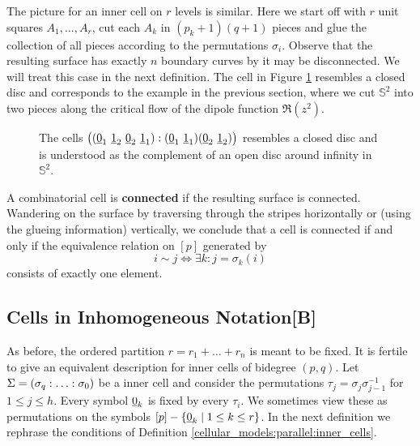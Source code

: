 The picture for an inner cell on $r$ levels is similar.
Here we start off with $r$ unit squares $A_1, \ldots, A_r$, cut each $A_k$ in $(p_k+1)(q+1)$ pieces and glue the collection of all pieces according to the permutations $\sigma_i$.
Observe that the resulting surface has exactly $n$ boundary curves by it may be disconnected.
We will treat this case in the next definition.
The cell in Figure \ref{cellular_models:parallel:closed_disc} resembles a closed disc and corresponds to the example in the previous section, where we cut $\mathbb S^2$ into two pieces along the critical flow of the dipole function $\Re(z^2)$.
\begin{figure}[ht]
\centering
{}
\caption{\label{cellular_models:parallel:closed_disc}The cells $\big((\underline{\smash{0}}_1\ \underline{\smash{1}}_2\ \underline{\smash{0}}_2\ \underline{\smash{1}}_1): (\underline{\smash{0}}_1\ \underline{\smash{1}}_1)(\underline{\smash{0}}_2\ \underline{\smash{1}}_2)\big)$ resembles a closed disc and is understood as the complement of an open disc around infinity in $\mathbb S^2$.}
\end{figure}

\begin{defi}
    \label{cellular_models:parallel:connected}
    A combinatorial cell is {\bf connected} if the resulting surface is connected.
    Wandering on the surface by traversing through the stripes horizontally or (using the glueing information) vertically, we conclude that a cell is connected if and only if the equivalence relation on $[p]$ generated by
    \[
        i \sim j \iff \exists k : j = \sigma_k(i)
    \]
    consists of exactly one element.
\end{defi}

\subsection{Cells in Inhomogeneous Notation[B]}
\label{cellular_models:parallel:cells_in_inhomogenous_notation}
As before, the ordered partition $r = r_1 + \ldots + r_n$ is meant to be fixed.
It is fertile to give an equivalent description for inner cells of bidegree $(p,q)$.
Let $\Sigma = \homogq$ be a inner cell and consider the permutations $\tau_j = \sigma_j \sigma_{j-1}^{-1}$ for $1 \le j \le h$.
Every symbol $\underline{\smash{0}}_k$ is fixed by every $\tau_i$.
We sometimes view these as permutations on the symbols $[p] - \{ \underline{\smash{0}}_k \mid 1 \le k \le r\}$.
In the next definition we rephrase the conditions of Definition \ref{cellular_models:parallel:inner_cells}.

